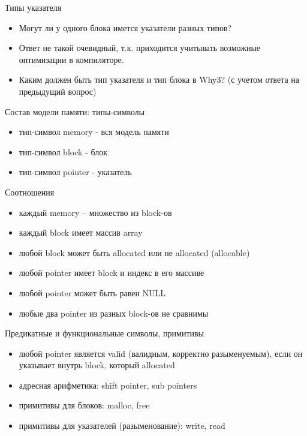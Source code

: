 \documentclass[hyperref={unicode=true}]{beamer}
\begin{document}
    \begin{frame}{Типы указателя}
    \begin{itemize}
    \item
    Могут ли у одного блока имется указатели
    разных типов?
    \item
    Ответ не такой очевидный, т.к. приходится
    учитывать возможные оптимизации в компиляторе.
    \item
    Каким должен быть тип указателя и тип блока
    в Why3? (с учетом ответа на предыдущий вопрос)
    \end{itemize}
    \end{frame}

    \begin{frame}{Состав модели памяти: типы-символы}
    \begin{itemize}
    \item
    тип-символ memory - вся модель памяти
    \item
    тип-символ block - блок
    \item
    тип-символ pointer - указатель
    \end{itemize}
    \end{frame}

    \begin{frame}{Соотношения}
    \begin{itemize}
    \item
    каждый memory -- множество из block-ов
    \item
    каждый block имеет массив array
    \item
    любой block может быть allocated или не allocated (allocable)
    \item
    любой pointer имеет block и индекс в его массиве
    \item
    любой pointer может быть равен NULL
    \item
    любые два pointer из разных block-ов не сравнимы
    \end{itemize}
    \end{frame}

    \begin{frame}{Предикатные и функциональные символы, примитивы}
    \begin{itemize}
    \item
    любой pointer является valid (валидным, корректно разыменуемым), если
    он указывает внутрь block, который allocated
    \item
    адресная арифметика: shift pointer, sub pointers
    \item
    примитивы для блоков: malloc, free
    \item
    примитивы для указателей (разыменование): write, read
    \end{itemize}
    \end{frame}
\end{document}
